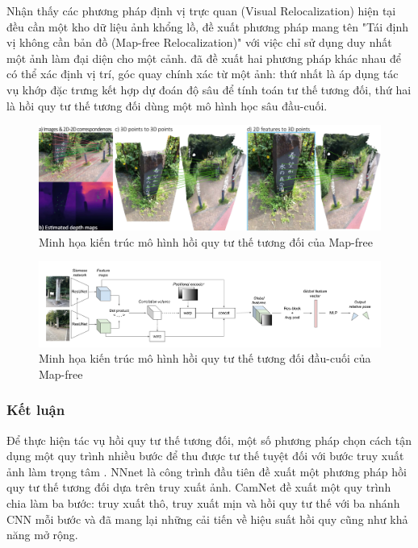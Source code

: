 Nhận thấy các phương pháp định vị trực quan (Visual Relocalization) hiện tại đều cần một kho dữ liệu ảnh khổng lồ, \cite{arnold2022mapfree} đề xuất phương pháp mang tên "Tái định vị không cần bản đồ (Map-free Relocalization)" với việc chỉ sử dụng duy nhất một ảnh làm đại diện cho một cảnh. \cite{arnold2022mapfree} đã đề xuất hai phương pháp khác nhau để có thể xác định vị trí, góc quay chính xác từ một ảnh: thứ nhất là áp dụng tác vụ khớp đặc trưng kết hợp dự đoán độ sâu để tính toán tư thế tương đối, thứ hai là hồi quy tư thế tương đối dùng một mô hình học sâu đầu-cuối.
\begin{figure}[H]
    \centering
    \includegraphics[width=\textwidth]{pics/Chapter2/mapfreeFMDE}
    \caption{Minh họa kiến trúc mô hình hồi quy tư thế tương đối của Map-free \cite{arnold2022mapfree}}
\end{figure}
\begin{figure}[H]
    \centering
    \includegraphics[width=\textwidth]{pics/Chapter2/mapfreeRPR}
    \caption{Minh họa kiến trúc mô hình hồi quy tư thế tương đối đầu-cuối của Map-free \cite{arnold2022mapfree}}
\end{figure}

\subsubsection*{Kết luận}
Để thực hiện tác vụ hồi quy tư thế tương đối, một số phương pháp chọn cách tận dụng một quy trình nhiều bước để thu được tư thế tuyệt đối với bước truy xuất ảnh làm trọng tâm \cite{laskar2017camera, 10.1007/978-3-030-01264-9_46, 9008579, zhou2020learn}. NNnet \cite{laskar2017camera} là công trình đầu tiên đề xuất một phương pháp hồi quy tư thế tương đối dựa trên truy xuất ảnh. CamNet \cite{9008579} đề xuất một quy trình chia làm ba bước: truy xuất thô, truy xuất mịn và hồi quy tư thế với ba nhánh CNN mỗi bước và đã mang lại những cải tiến về hiệu suất hồi quy cũng như khả năng mở rộng.

